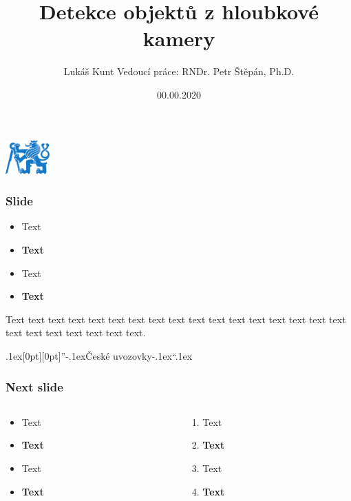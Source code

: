 \documentclass{beamer}
\author[Lukáš Kunt]{{\large Lukáš Kunt} {\small \texorpdfstring{\vspace{5mm} \newline Vedoucí práce: RNDr. Petr Štěpán, Ph.D. }{}}}
\institute[ČVUT]{České vysoké učení technické v Praze \\ Fakulta elektrotechnická}
\title[Detekce objektů z hloubkové kamery]{Detekce objektů z hloubkové kamery}
\date[00.00.2020]{00.00.2020}
\def\bq{\mbox{\kern.1ex\protect\raisebox{-1.3ex}[0pt][0pt]{''}\kern-.1ex}}
\def\eq{\mbox{\kern-.1ex``\kern.1ex}}
\gdef\uv#1{\bq #1\eq}
\begin{document}
\begin{frame}
	\titlepage
	\begin{center}
  		\includegraphics[height=1.3cm]{symbol_cvut_plna_samostatna_verze.pdf}
	\end{center}
\end{frame}



\begin{frame}
	\frametitle{Slide}	
\begin{itemize}
	\item Text
	\item \textbf{Text}
    \item \textcolor{cvut_navy}{Text} 
    \item \textcolor{cvut_navy}{\textbf{Text}} 
\end{itemize}
Text text text text text text text text text text text text text text text text text text text text text text text text.

\uv{České uvozovky}
\end{frame}



\begin{frame}
	\frametitle{Next slide}	
	\begin{columns}[onlytextwidth]
		\begin{column}{0.5\textwidth}
			\begin{itemize}
				\item Text
				\item \textbf{Text}
    			\item \textcolor{cvut_navy}{Text} 
			    \item \textcolor{cvut_navy}{\textbf{Text}} 
			\end{itemize}
		\end{column}

 	 	\begin{column}{0.5\textwidth}
			 \begin{enumerate}
				\item Text
				\item \textbf{Text}
    			\item \textcolor{cvut_navy}{Text} 
			    \item \textcolor{cvut_navy}{\textbf{Text}}
			\end{enumerate}
		\end{column}
	\end{columns}
\end{frame}		
\end{document}
